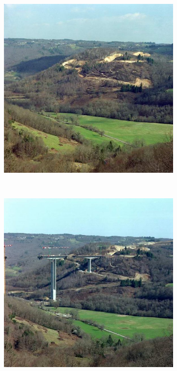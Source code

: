 \begin{figure}[h]
 \centering
	 \begin{subfigure}[t]{0.3\textwidth}	
			\includegraphics[width=\textwidth]{images/intro/opp_01}
	\end{subfigure}
	~
	 \begin{subfigure}[t]{0.3\textwidth}	
			\includegraphics[width=\textwidth]{images/intro/opp_02}

\end{subfigure}
\end{figure}
